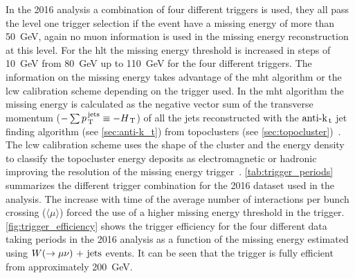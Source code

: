 In the 2016 analysis a combination of four different triggers is used, they all
pass the level one trigger selection if the event have a missing energy of more
than 50~GeV, again no muon information is used in the missing energy
reconstruction at this level. For the \gls{hlt} the missing energy threshold is
increased in steps of 10~GeV from 80~GeV up to 110~GeV for the four different
triggers. The information on the missing energy takes advantage of the \gls{mht}
algorithm or the \gls{lcw} calibration scheme depending on the trigger used. In
the \gls{mht} algorithm the missing energy is calculated as the negative vector
sum of the transverse momentum
($- \sum p_\mathrm{\, T}^\mathrm{\, jets} \equiv - H_\mathrm{\, T}$) of all the jets
reconstructed with the $\text{anti-k}_\mathrm{\, t}$ jet finding algorithm (see \cref{sec:anti-k_t})
from topoclusters (see \cref{sec:topocluster})~\cite{MHTAlgorithm}. The
\gls{lcw} calibration scheme uses the shape of the cluster and the energy
density to classify the topocluster energy deposits as electromagnetic or
hadronic improving the resolution of the missing energy
trigger~\cite{LCWCalibration}. \cref{tab:trigger_periods} summarizes the
different trigger combination for the 2016 dataset used in the analysis. The
increase with time of the average number of interactions per bunch crossing
($\langle \mu \rangle$) forced the use of a higher missing energy threshold in
the trigger. \cref{fig:trigger_efficiency} shows the trigger efficiency for the
four different data taking periods in the 2016 analysis as a function of the
missing energy estimated using $W (\rightarrow \mu \nu)\mathrm{~+~jets}$ events. It can be seen that the
trigger is fully efficient from approximately 200~GeV.
